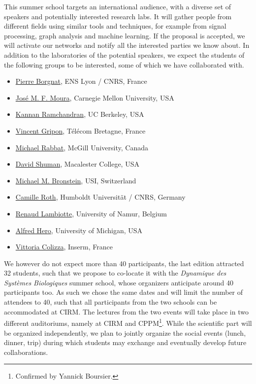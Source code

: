 \documentclass[a4paper]{scrartcl}
\begin{document}
This summer school targets an international audience, with a diverse set of
speakers and potentially interested research labs. It will gather people from
different fields using similar tools and techniques, for example from signal
processing, graph analysis and machine learning. If the proposal is accepted, we
will activate our networks and notify all the interested parties we know about.
In addition to the laboratories of the potential speakers, we expect the
students of the following groups to be interested, some of which we have
collaborated with.
\begin{itemize}
	\setlength{\itemsep}{0pt} \setlength{\parskip}{0pt}
	\item \href{http://perso.ens-lyon.fr/pierre.borgnat/}
		{Pierre Borgnat}, ENS Lyon / CNRS, France
	\item \href{https://users.ece.cmu.edu/~moura/}
		{José M. F. Moura}, Carnegie Mellon University, USA
	\item \href{https://www.eecs.berkeley.edu/~kannanr/}
		{Kannan Ramchandran}, UC Berkeley, USA
	\item \href{http://www.vincent-gripon.com/}
		{Vincent Gripon}, Télécom Bretagne, France
	\item \href{http://www.ece.mcgill.ca/~mrabba1/}
		{Michael Rabbat}, McGill University, Canada
	\item \href{http://www.macalester.edu/~dshuman1/}
		{David Shuman}, Macalester College, USA
	\item \href{http://www.inf.usi.ch/bronstein/}
		{Michael M. Bronstein}, USI, Switzerland
	\item \href{http://camille.roth.free.fr/index.php}
		{Camille Roth}, Humboldt Universität / CNRS, Germany
	\item \href{http://xn.unamur.be/}
		{Renaud Lambiotte}, University of Namur, Belgium
	\item \href{https://web.eecs.umich.edu/~hero/}
		{Alfred Hero}, University of Michigan, USA
	\item \href{http://www.epicx-lab.com/vittoria-colizza.html}
		{Vittoria Colizza}, Inserm, France
\end{itemize}

We however do not expect more than 40 participants, the last edition attracted
32 students, such that we propose to co-locate it with the \textit{Dynamique des
Systèmes Biologiques} summer school, whose organizers anticipate around 40
participants too. As such we chose the same dates and will limit the number of
attendees to 40, such that all participants from the two schools can be
accommodated at CIRM. The lectures from the two events will take place in two
different auditoriums, namely at CIRM and CPPM\footnote{Confirmed by Yannick
Boursier.}. While the scientific part will be organized independently, we plan
to jointly organize the social events (lunch, dinner, trip) during which
students may exchange and eventually develop future collaborations.
\end{document}
